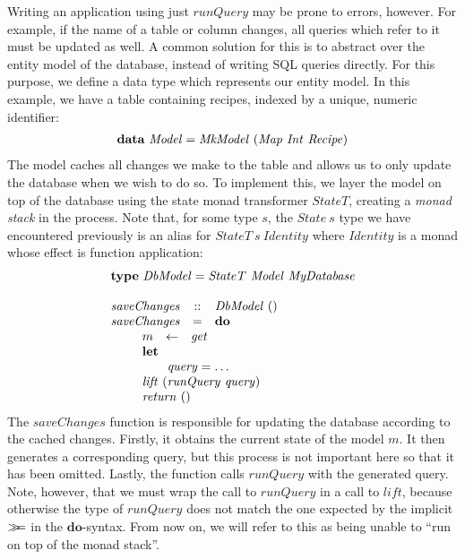 Writing an application using just $\mathit{runQuery}$ may be prone to errors, however. For example, if the name of a table or column changes, all queries which refer to it must be updated as well. A common solution for this is to abstract over the entity model of the database, instead of writing SQL queries directly. For this purpose, we define a data type which represents our entity model. In this example, we have a table containing recipes, indexed by a unique, numeric identifier:
\begin{displaymath}
\begin{array}{lcl}
\multicolumn{3}{l}{\mathbf{data}~\mathit{Model} = \mathit{MkModel}~(\mathit{Map}~\mathit{Int}~\mathit{Recipe})}
\end{array}
\end{displaymath}
The model caches all changes we make to the table and allows us to only update the database when we wish to do so. To implement this, we layer the model on top of the database using the state monad transformer $\mathit{StateT}$, creating a \emph{monad stack} in the process. Note that, for some type $s$, the $\mathit{State}~s$ type we have encountered previously is an alias for $\mathit{StateT}~s~\mathit{Identity}$ where $\mathit{Identity}$ is a monad whose effect is function application:
\begin{displaymath}
\begin{array}{lcl}
\multicolumn{3}{l}{\mathbf{type}~\mathit{DbModel} = \mathit{StateT}~\mathit{Model}~\mathit{MyDatabase}}\\\\
\mathit{saveChanges} & :: & \mathit{DbModel}~() \\
\mathit{saveChanges} & = & \mathbf{do} \\
\multicolumn{3}{l}{\qquad \begin{array}{lcl}
    m & \leftarrow & \mathit{get} \\
    \multicolumn{3}{l}{\mathbf{let}} \\
    \multicolumn{3}{l}{\qquad \mathit{query} = \ldots} \\
    \multicolumn{3}{l}{\mathit{lift}~(\mathit{runQuery}~\mathit{query})}\\
    \multicolumn{3}{l}{\mathit{return}~()}
\end{array} }
\end{array}
\end{displaymath}
The $\mathit{saveChanges}$ function is responsible for updating the database according to the cached changes. Firstly, it obtains the current state of the model $m$. It then generates a corresponding query, but this process is not important here so that it has been omitted. Lastly, the function calls $\mathit{runQuery}$ with the generated query. Note, however, that we must wrap the call to $\mathit{runQuery}$ in a call to $\mathit{lift}$, because otherwise the type of $\mathit{runQuery}$ does not match the one expected by the implicit $\gg\!\!=$ in the $\mathbf{do}$-syntax. From now on, we will refer to this as being unable to ``run on top of the monad stack''.


